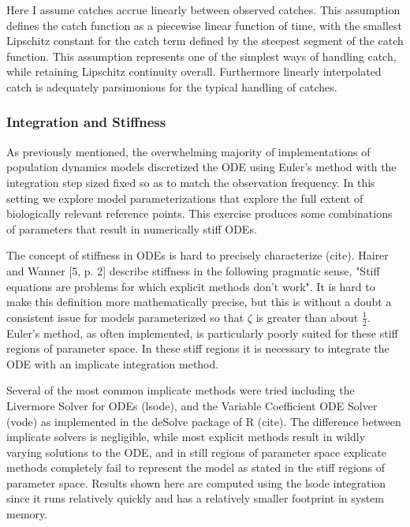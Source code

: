 \documentclass[12pt]{article}
\begin{document}
{%
Here I assume catches accrue linearly between observed catches. This assumption
defines the catch function as a piecewise linear function of time, with the
smallest Lipschitz constant for the catch term defined by the steepest segment
of the catch function. This assumption represents one of the simplest ways of
handling catch, while retaining Lipschitz continuity overall. Furthermore linearly
interpolated catch is adequately parsimonious for the typical handling of catches.

%
\subsubsection{Integration and Stiffness}

%
As previously mentioned, the overwhelming majority of implementations of
population dynamics models discretized the ODE using Euler's method with the
integration step sized fixed so as to match the observation frequency. In this
setting we explore model parameterizations that explore the full extent of
biologically relevant reference points. This exercise produces some
combinations of parameters that result in numerically stiff ODEs.

%
The concept of stiffness in ODEs is hard to precisely characterize
({\color{red}cite}). Hairer and Wanner [5, p. 2] describe stiffness in the
following pragmatic sense, "Stiff equations are problems for which explicit
methods don't work". It is hard to make this definition more mathematically
precise, but this is without a doubt a consistent issue for models parameterized
so that $\zeta$ is greater than about $\frac{1}{2}$. Euler's method, as often
implemented, is particularly poorly suited for these stiff regions of parameter
space. In these stiff regions it is necessary to integrate the ODE with an
implicate integration method.

%
Several of the most common implicate methods were tried including the
Livermore Solver for ODEs (lsode), and the Variable Coefficient ODE Solver
(vode) as implemented in the deSolve package of R ({\color{red}cite}). The
difference between implicate solvers is negligible, while most explicit
methods result in wildly varying solutions to the ODE, and in still regions of
parameter space explicate methods completely fail to represent the model as
stated in the stiff regions of parameter space. Results shown here are computed
using the lsode integration %
since it runs relatively quickly and has a relatively smaller footprint in system memory.


}
\end{document}
